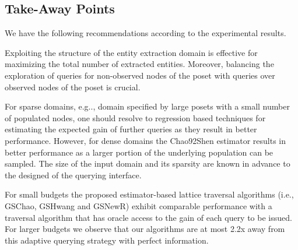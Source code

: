 \subsection{Take-Away Points}
We have the following recommendations according to the experimental results.
\squishlist
\item Exploiting the structure of the entity extraction domain is effective for maximizing the total number of extracted entities. Moreover, balancing the exploration of queries for non-observed nodes of the poset with queries over observed nodes of the poset is crucial.
\item For sparse domains, e.g.., domain specified by large posets with a small number of populated nodes, one should resolve to regression based techniques for estimating the expected gain of further queries as they result in better performance. However, for dense domains the Chao92Shen estimator results in better performance as a larger portion of the underlying population can be sampled. The size of the input domain and its sparsity are known in advance to the designed of the querying interface. 
\item For small budgets the proposed estimator-based lattice traversal algorithms (i.e., GSChao, GSHwang and GSNewR) exhibit comparable performance with a traversal algorithm that has oracle access to the gain of each query to be issued. For larger budgets we observe that our algorithms are at most 2.2x away from this adaptive querying strategy with perfect information.
\squishend